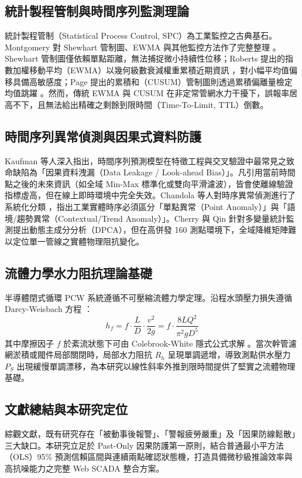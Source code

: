 \documentclass[fontset=none, a4paper, 12pt]{ctexart}
\begin{document}
\subsection{統計製程管制與時間序列監測理論}
統計製程管制（Statistical Process Control, SPC）為工業監控之古典基石。Montgomery 對 Shewhart 管制圖、EWMA 與其他監控方法作了完整整理 \cite{montgomery2009introduction}。Shewhart 管制圖僅依賴單點距離，無法捕捉微小持續性位移；Roberts 提出的指數加權移動平均（EWMA）以幾何級數衰減權重累積近期資訊 \cite{roberts1959control}，對小幅平均值偏移具備高敏感度；Page 提出的累積和（CUSUM）管制圖則透過累積偏離量檢定均值跳躍 \cite{page1954continuous}。然而，傳統 EWMA 與 CUSUM 在非定常管網水力干擾下，誤報率居高不下，且無法給出精確之剩餘到限時間（Time-To-Limit, TTL）倒數。

\subsection{時間序列異常偵測與因果式資料防護}
Kaufman 等人深入指出，時間序列預測模型在特徵工程與交叉驗證中最常見之致命缺陷為「因果資料洩漏（Data Leakage / Look-ahead Bias）」\cite{kaufman2012leakage}。凡引用當前時間點之後的未來資訊（如全域 Min-Max 標準化或雙向平滑濾波），皆會使離線驗證指標虛高，但在線上即時環境中完全失效。Chandola 等人對時序異常偵測進行了系統化分類 \cite{chandola2009anomaly}，指出工業實體時序必須區分「單點異常（Point Anomaly）」與「語境/趨勢異常（Contextual/Trend Anomaly）」。Cherry 與 Qin 針對多變量統計監測提出動態主成分分析（DPCA）\cite{cherry2006multivariate}，但在高併發 160 測點環境下，全域降維矩陣難以定位單一管線之實體物理阻抗變化。

\subsection{流體力學水力阻抗理論基礎}
半導體閉式循環 PCW 系統遵循不可壓縮流體力學定理。沿程水頭壓力損失遵循 Darcy-Weisbach 方程 \cite{darcy1857recherches}：
\begin{equation}
h_f = f \cdot \frac{L}{D} \cdot \frac{v^2}{2g} = f \cdot \frac{8 L Q^2}{\pi^2 g D^5}
\end{equation}
其中摩擦因子 $f$ 於紊流狀態下可由 Colebrook-White 隱式公式求解 \cite{colebrook1939turbulent}。當次幹管濾網淤積或閥件局部關閉時，局部水力阻抗 $R_h$ 呈現單調遞增，導致測點供水壓力 $P_S$ 出現緩慢單調漂移，為本研究以線性斜率外推到限時間提供了堅實之流體物理基礎。

\subsection{文獻總結與本研究定位}
綜觀文獻，既有研究存在「被動事後報警」、「警報疲勞嚴重」及「因果防線鬆散」三大缺口。本研究立足於 Past-Only 因果防護第一原則，結合普通最小平方法（OLS）95\% 預測信賴區間與連續兩點確認狀態機，打造具備微秒級推論效率與高抗噪能力之完整 Web SCADA 整合方案。
\end{document}
